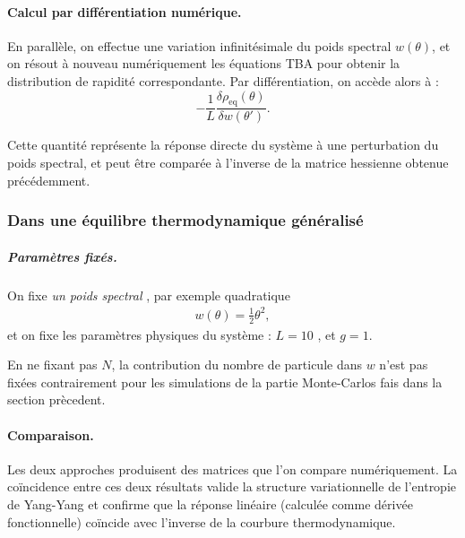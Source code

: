 \paragraph{Calcul par différentiation numérique.}

En parallèle, on effectue une variation infinitésimale du poids spectral \(w(\theta)\), et on résout à nouveau numériquement les équations TBA pour obtenir la distribution de rapidité correspondante. Par différentiation, on accède alors à :
\[
- \frac{1}{L} \frac{\delta \rho_{\mathrm{eq}}(\theta)}{\delta w(\theta')}.
\]

Cette quantité représente la réponse directe du système à une perturbation du poids spectral, et peut être comparée à l’inverse de la matrice hessienne obtenue précédemment.



\subsubsection{Dans une équilibre thermodynamique généralisé}

\subparagraph{Paramètres fixés.}
On fixe {\em un poids spectral} , par exemple quadratique
\begin{eqnarray}
	w(\theta) = \tfrac{1}{2} \theta^2,
\end{eqnarray}
et on fixe les paramètres physiques du système : \( L = 10 \) , et \( g = 1 \).

En ne fixant pas $N$, la contribution du nombre de particule dans $w$ n'est pas fixées contrairement pour les simulations de la partie Monte-Carlos fais dans la section prècedent.

\paragraph{Comparaison.}
Les deux approches produisent des matrices  que l’on compare numériquement. La coïncidence entre ces deux résultats valide la structure variationnelle de l'entropie de Yang-Yang et confirme que la réponse linéaire (calculée comme dérivée fonctionnelle) coïncide avec l’inverse de la courbure thermodynamique.

